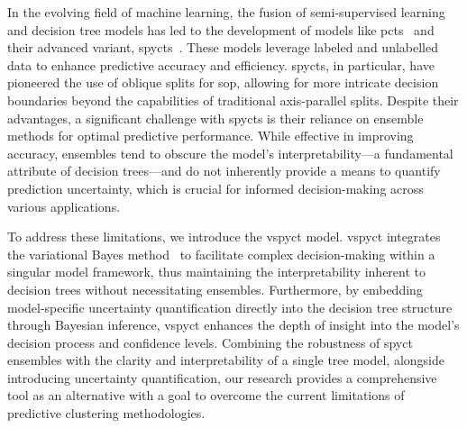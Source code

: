 \documentclass[3p,review,authoryear]{elsarticle}
\begin{document}
In the evolving field of machine learning, the fusion of semi-supervised learning and decision tree models has led to the development of models like \glspl{pct}~\citep{Kocev_2013} and their advanced variant, \glspl{spyct}~\citep{Stepi_nik_2021}.
These models leverage labeled and unlabelled data to enhance predictive accuracy and efficiency.
\Glspl{spyct}, in particular, have pioneered the use of oblique splits for \gls{sop}, allowing for more intricate decision boundaries beyond the capabilities of traditional axis-parallel splits.
Despite their advantages, a significant challenge with \glspl{spyct} is their reliance on ensemble methods for optimal predictive performance. 
While effective in improving accuracy, ensembles tend to obscure the model's interpretability—a fundamental attribute of decision trees—and do not inherently provide a means to quantify prediction uncertainty, which is crucial for informed decision-making across various applications.

To address these limitations, we introduce the \gls{vspyct} model.
\gls{vspyct} integrates the variational Bayes method~\citep{Blei_2017} to facilitate complex decision-making within a singular model framework, thus maintaining the interpretability inherent to decision trees without necessitating ensembles.
Furthermore, by embedding model-specific uncertainty quantification directly into the decision tree structure through Bayesian inference, \gls{vspyct} enhances the depth of insight into the model's decision process and confidence levels.
Combining the robustness of \gls{spyct} ensembles with the clarity and interpretability of a single tree model, alongside introducing uncertainty quantification, our research provides a comprehensive tool as an alternative with a goal to overcome the current limitations of predictive clustering methodologies.
\end{document}
